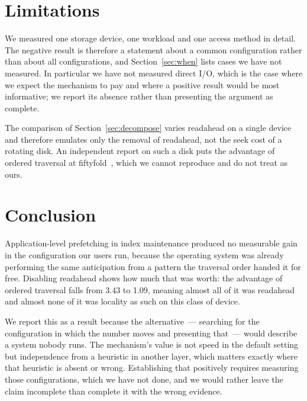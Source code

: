 \section{Limitations}

We measured one storage device, one workload and one access method in detail.
The negative result is therefore a statement about a common configuration rather
than about all configurations, and Section~\ref{sec:when} lists cases we have not
measured. In particular we have not measured direct I/O, which is the case where
we expect the mechanism to pay and where a positive result would be most
informative; we report its absence rather than presenting the argument as
complete.

The comparison of Section~\ref{sec:decompose} varies readahead on a single device
and therefore emulates only the removal of readahead, not the seek cost of a
rotating disk. An independent report on such a disk puts the advantage of ordered
traversal at fiftyfold~\cite{janes2019gistvacuum}, which we cannot reproduce and
do not treat as ours.

\section{Conclusion}

Application-level prefetching in index maintenance produced no measurable gain in
the configuration our users run, because the operating system was already
performing the same anticipation from a pattern the traversal order handed it for
free. Disabling readahead shows how much that was worth: the advantage of ordered
traversal falls from 3.43 to 1.09, meaning almost all of it was readahead and
almost none of it was locality as such on this class of device.

We report this as a result because the alternative~--- searching for the
configuration in which the number moves and presenting that~--- would describe a
system nobody runs. The mechanism's value is not speed in the default setting but
independence from a heuristic in another layer, which matters exactly where that
heuristic is absent or wrong. Establishing that positively requires measuring
those configurations, which we have not done, and we would rather leave the claim
incomplete than complete it with the wrong evidence.
